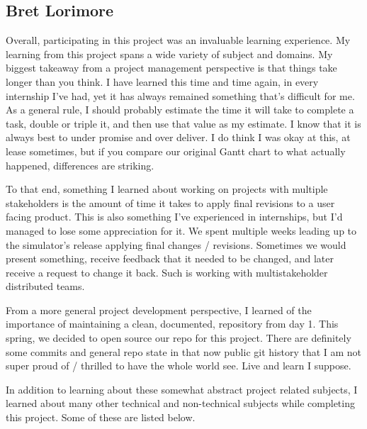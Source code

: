 \documentclass[10pt, onecolumn, draftclsnofoot, letterpaper, compsoc]{IEEEtran}
\begin{document}
\subsection{Bret Lorimore}

Overall, participating in this project was an invaluable learning experience.
My learning from this project spans a wide variety of subject and domains.
My biggest takeaway from a project management perspective is that things take
longer than you think. I have learned this time and time again, in every
internship I've had, yet it has always remained something that's difficult for
me. As a general rule, I should probably estimate the time it will take to
complete a task, double or triple it, and then use that value as my estimate.
I know that it is always best to under promise and over deliver. I do think
I was okay at this, at lease sometimes, but if you compare our original Gantt
chart to what actually happened, differences are striking.

To that end, something I learned about working on projects with multiple stakeholders
is the amount of time it takes to apply final revisions to a user facing product.
This is also something I've experienced in internships, but I'd managed to lose some
appreciation for it. We spent multiple weeks leading up to the simulator's release
applying final changes / revisions. Sometimes we would present something, receive
feedback that it needed to be changed, and later receive a request to change it
back. Such is working with multistakeholder distributed teams.

From a more general project development perspective, I learned of the importance of
maintaining a clean, documented, repository from day 1. This spring, we decided
to open source our repo for this project. There are definitely some commits and
general repo state in that now public git history that I am not super proud of /
thrilled to have the whole world see. Live and learn I suppose.


In addition to learning about these somewhat abstract project related subjects, I learned
about many other technical and non-technical subjects while completing this project.
Some of these are listed below. \\
\end{document}
